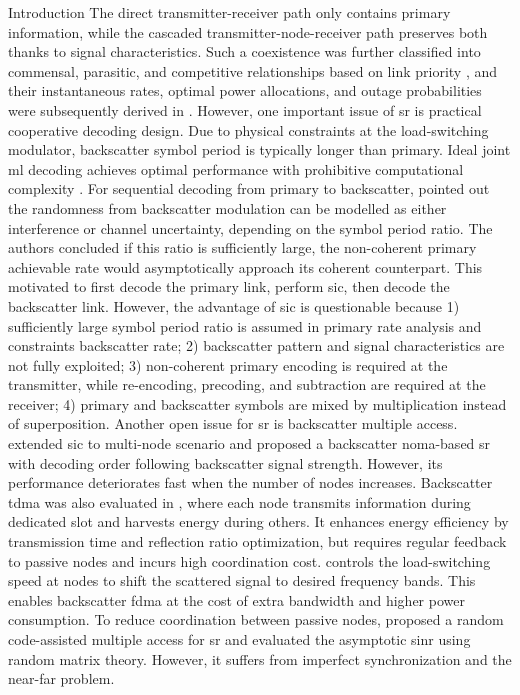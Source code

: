 \documentclass[journal]{IEEEtran}
\begin{document}
\begin{section}{Introduction}
	The direct transmitter-receiver path only contains primary information, while the cascaded transmitter-node-receiver path preserves both thanks to signal characteristics.
	Such a coexistence was further classified into commensal, parasitic, and competitive relationships based on link priority \cite{Guo2019b}, and their instantaneous rates, optimal power allocations, and outage probabilities were subsequently derived in \cite{Guo2019b,Ding2020}.
	However, one important issue of \gls{sr} is practical cooperative decoding design.
	Due to physical constraints at the load-switching modulator, backscatter symbol period is typically longer than primary.
	Ideal joint \gls{ml} decoding achieves optimal performance with prohibitive computational complexity \cite{Yang2018,Liang2020,Zhang2022}.
	For sequential decoding from primary to backscatter, \cite{Long2020a} pointed out the randomness from backscatter modulation can be modelled as either interference or channel uncertainty, depending on the symbol period ratio.
	The authors concluded if this ratio is sufficiently large, the non-coherent primary achievable rate would asymptotically approach its coherent counterpart.
	This motivated \cite{Long2020a,Liang2020,Guo2019b,Ding2020,Zhou2019a,Wu2021a,Xu2021a,Yang2021a,Yang2018,Han2021,Zhang2022} to first decode the primary link, perform \gls{sic}, then decode the backscatter link.
	However, the advantage of \gls{sic} is questionable because 1) sufficiently large symbol period ratio is assumed in primary rate analysis and constraints backscatter rate; 2) backscatter pattern and signal characteristics are not fully exploited; 3) non-coherent primary encoding is required at the transmitter, while re-encoding, precoding, and subtraction are required at the receiver; 4) primary and backscatter symbols are mixed by multiplication instead of superposition.
	Another open issue for \gls{sr} is backscatter multiple access.
	\cite{Xu2021a} extended \gls{sic} to multi-node scenario and proposed a backscatter \gls{noma}-based \gls{sr} with decoding order following backscatter signal strength.
	However, its performance deteriorates fast when the number of nodes increases.
	Backscatter \gls{tdma} was also evaluated in \cite{Yang2021a}, where each node transmits information during dedicated slot and harvests energy during others.
	It enhances energy efficiency by transmission time and reflection ratio optimization, but requires regular feedback to passive nodes and incurs high coordination cost.
	\cite{Vougioukas2019} controls the load-switching speed at nodes to shift the scattered signal to desired frequency bands.
	This enables backscatter \gls{fdma} at the cost of extra bandwidth and higher power consumption.
	To reduce coordination between passive nodes, \cite{Han2021} proposed a random code-assisted multiple access for \gls{sr} and evaluated the asymptotic \gls{sinr} using random matrix theory.
	However, it suffers from imperfect synchronization and the near-far problem.


\end{section}
\end{document}
